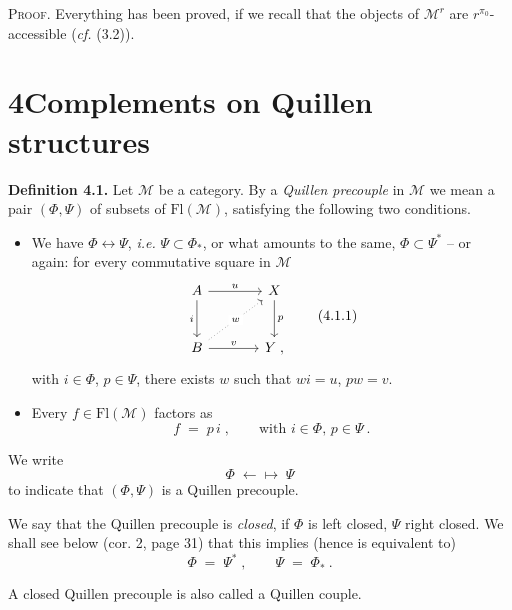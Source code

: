 \documentclass[11pt]{article}
\newcommand{\printedpage}[1]{\marginpar{\footnotesize p.~#1}}
\newcommand{\msp}[1]{\marginpar{\footnotesize [#1]}}
\newcommand{\Fl}{\mathrm{Fl}}
\newcommand{\qpre}{\mathrel{\leftarrow\!\!\!\!\mapsto}}
\begin{document}
\printedpage{19}

\msp{page 28}
\textsc{Proof}. Everything has been proved, if we recall that the objects of $\mathcal{M}^r$ are $r^{\pi_0}$-accessible (\textit{cf.} (3.2)).

\section*{4\quad Complements on Quillen structures}

\textbf{Definition 4.1.} Let $\mathcal{M}$ be a category. By a \textit{Quillen precouple} in $\mathcal{M}$ we mean a pair $(\Phi,\Psi)$ of subsets of $\Fl(\mathcal{M})$, satisfying the following two conditions.
\begin{itemize}[leftmargin=2.5em]
\item[\textit{a})] We have $\Phi\longleftrightarrow\Psi$, \textit{i.e.} $\Psi\subset\Phi_*$, or what amounts to the same, $\Phi\subset\Psi^*$ -- or again: for every commutative square in $\mathcal{M}$
\[
\begin{tikzcd}[row sep=large, column sep=large]
A \arrow[r, "u"] \arrow[d, "i"'] & X \arrow[d, "p"] \\
B \arrow[ur, dotted, "w" description] \arrow[r, "v"] & Y \;,
\end{tikzcd}
\tag*{(4.1.1)}
\]
with $i\in\Phi$, $p\in\Psi$, there exists $w$ such that $wi=u$, $pw=v$.
\item[\textit{b})] Every $f\in\Fl(\mathcal{M})$ factors as
\[
f \;=\; p\,i\;, \qquad \text{with } i\in\Phi,\, p\in\Psi\ .
\]
\end{itemize}
We write
\[
\Phi \;\qpre\; \Psi
\tag*{(4.1.2)}
\] %
to indicate that $(\Phi,\Psi)$ is a Quillen precouple.

We say that the Quillen precouple is \textit{closed}, if $\Phi$ is left closed, $\Psi$ right closed. We shall see below (cor. 2, page 31) that this implies (hence is equivalent to) %
\[
\Phi \;=\; \Psi^*\;, \qquad \Psi \;=\; \Phi_*\ .
\tag*{(4.1.3)}
\]

\msp{page 29}
A closed Quillen precouple is also called a Quillen couple.
\end{document}
